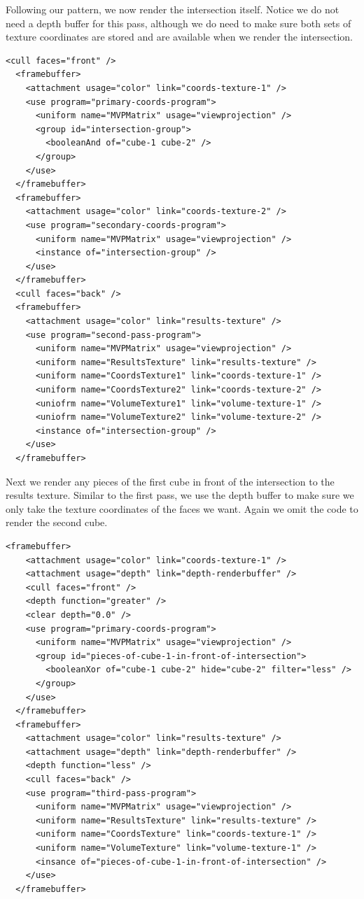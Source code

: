 \documentclass{article}
\begin{document}
Following our pattern, we now render the intersection itself.  Notice we do not
need a depth buffer for this pass, although we do need to make sure both sets of
texture coordinates are stored and are available when we render the
intersection.

\begin{Verbatim}[fontsize=\small]
  <cull faces="front" />
  <framebuffer>
    <attachment usage="color" link="coords-texture-1" />
    <use program="primary-coords-program">
      <uniform name="MVPMatrix" usage="viewprojection" />
      <group id="intersection-group">
        <booleanAnd of="cube-1 cube-2" />
      </group>
    </use>
  </framebuffer>
  <framebuffer>
    <attachment usage="color" link="coords-texture-2" />
    <use program="secondary-coords-program">
      <uniform name="MVPMatrix" usage="viewprojection" />
      <instance of="intersection-group" />
    </use>
  </framebuffer>
  <cull faces="back" />
  <framebuffer>
    <attachment usage="color" link="results-texture" />
    <use program="second-pass-program">
      <uniform name="MVPMatrix" usage="viewprojection" />
      <uniform name="ResultsTexture" link="results-texture" />
      <uniform name="CoordsTexture1" link="coords-texture-1" />
      <uniform name="CoordsTexture2" link="coords-texture-2" />
      <uniofrm name="VolumeTexture1" link="volume-texture-1" />
      <uniofrm name="VolumeTexture2" link="volume-texture-2" />
      <instance of="intersection-group" />
    </use>
  </framebuffer>
\end{Verbatim}

Next we render any pieces of the first cube in front of the intersection to the
results texture.  Similar to the first pass, we use the depth buffer to make
sure we only take the texture coordinates of the faces we want.  Again we omit
the code to render the second cube.

\begin{Verbatim}[fontsize=\small]
  <framebuffer>
    <attachment usage="color" link="coords-texture-1" />
    <attachment usage="depth" link="depth-renderbuffer" />
    <cull faces="front" />
    <depth function="greater" />
    <clear depth="0.0" />
    <use program="primary-coords-program">
      <uniform name="MVPMatrix" usage="viewprojection" />
      <group id="pieces-of-cube-1-in-front-of-intersection">
        <booleanXor of="cube-1 cube-2" hide="cube-2" filter="less" />
      </group>
    </use>
  </framebuffer>
  <framebuffer>
    <attachment usage="color" link="results-texture" />
    <attachment usage="depth" link="depth-renderbuffer" />
    <depth function="less" />
    <cull faces="back" />
    <use program="third-pass-program">
      <uniform name="MVPMatrix" usage="viewprojection" />
      <uniform name="ResultsTexture" link="results-texture" />
      <uniform name="CoordsTexture" link="coords-texture-1" />
      <uniform name="VolumeTexture" link="volume-texture-1" />
      <insance of="pieces-of-cube-1-in-front-of-intersection" />
    </use>
  </framebuffer>
\end{Verbatim}
\end{document}
